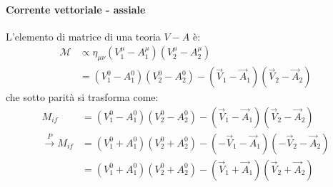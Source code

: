 \documentclass{subnucbo}
\begin{document}
\paragraph{Corrente vettoriale - assiale} L'elemento di matrice di una teoria $V-A$ è:
\begin{equation}
        \begin{aligned}
                \mathcal{M} & \propto \eta _ { \mu \nu } \left( V _ { 1 } ^ { \mu } - A _ { 1 } ^ { \mu } \right) \left( V _ { 2 } ^ { \mu } - A _ { 2 } ^ { \mu } \right) \\ & = \left( V _ { 1 } ^ { 0 } - A _ { 1 } ^ { 0 } \right) \left( V _ { 2 } ^ { 0 } - A _ { 2 } ^ { 0 } \right) - \left( \vec { V } _ { 1 } - \vec { A } _ { 1 } \right) \left( \vec { V } _ { 2 } - \vec { A } _ { 2 } \right)
        \end{aligned}
\end{equation}
che sotto parità si trasforma come:
\begin{equation}
        \begin{aligned}
                M _ { i f } & = \left( V _ { 1 } ^ { 0 } - A _ { 1 } ^ { 0 } \right) \left( V _ { 2 } ^ { 0 } - A _ { 2 } ^ { 0 } \right) - \left( \vec { V } _ { 1 } - \vec { A } _ { 1 } \right) \left( \vec { V } _ { 2 } - \vec { A } _ { 2 } \right) \\ \stackrel { P } { \longrightarrow } M _ { i f } & = \left( V _ { 1 } ^ { 0 } + A _ { 1 } ^ { 0 } \right) \left( V _ { 2 } ^ { 0 } + A _ { 2 } ^ { 0 } \right) - \left( - \vec { V } _ { 1 } - \vec { A } _ { 1 } \right) \left( - \vec { V } _ { 2 } - \vec { A } _ { 2 } \right) \\ & = \left( V _ { 1 } ^ { 0 } + A _ { 1 } ^ { 0 } \right) \left( V _ { 2 } ^ { 0 } + A _ { 2 } ^ { 0 } \right) - \left( \vec { V } _ { 1 } + \vec { A } _ { 1 } \right) \left( \vec { V } _ { 2 } + \vec { A } _ { 2 } \right)
        \end{aligned}
\end{equation}
\end{document}
